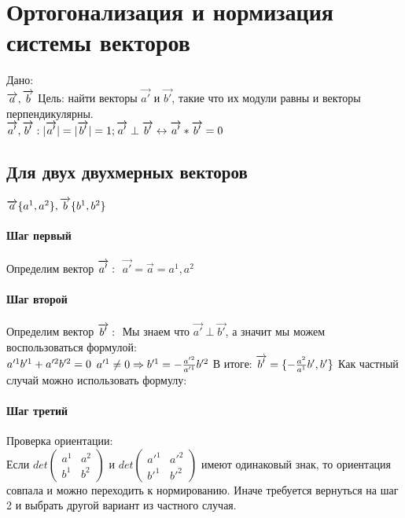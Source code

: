 \documentclass{article}
\begin{document}
\section{Ортогонализация и нормизация системы векторов}
Дано:\\
$\overrightarrow{a},\overrightarrow{b}\\$
Цель: найти векторы $\overrightarrow{a'}$ и $\overrightarrow{b'}$, такие что их модули равны и векторы перпендикулярны.\\
$\overrightarrow{a'},\overrightarrow{b'} : |\overrightarrow{a'}|=|\overrightarrow{b'}|=1;\overrightarrow{a'}\perp\overrightarrow{b'} \leftrightarrow \overrightarrow{a'}*\overrightarrow{b'}=0\\$
\subsection{Для двух двухмерных векторов}
$\overrightarrow{a}\{a^1,a^2\}, \overrightarrow{b}\{b^1,b^2\}\\$
\paragraph*{Шаг первый}
Определим вектор $\overrightarrow{a'}:\\$
$\overrightarrow{a'}=\overrightarrow{a}={a^1,a^2}$
\paragraph*{Шаг второй}
Определим вектор $\overrightarrow{b'}:\\$
Мы знаем что $\overrightarrow{a'}\perp\overrightarrow{b'}$, а значит мы можем воспользоваться формулой:\\
$a'^1b'^1+a'^2b'^2=0\\$
$a'^1\neq0 \Rightarrow b'^1=-\frac{a'^2}{a'^1}b'^2\\$
В итоге: $\overrightarrow{b'}=\{-\frac{a^2}{a^1}b',b'\}\\$
Как частный случай можно использовать формулу:
\paragraph*{Шаг третий}
Проверка ориентации:\\
Если 
$det
    \begin{pmatrix}
        {a^1} & {a^2}\\
        {b^1} & {b^2}
    \end{pmatrix}
$ и $det
\begin{pmatrix}
    {a'^1} & {a'^2}\\
    {b'^1} & {b'^2}
\end{pmatrix}
$ имеют одинаковый знак, то ориентация совпала и можно переходить к нормированию. Иначе требуется вернуться на шаг 2 и выбрать другой вариант из частного случая.
\end{document}
